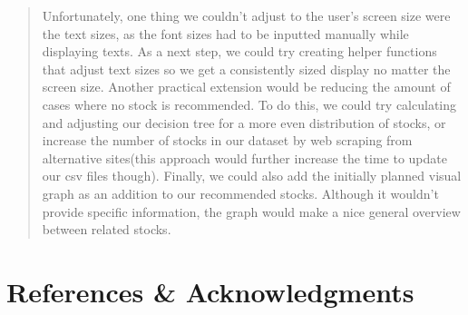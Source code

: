 \documentclass[fontsize=12pt]{article}
\begin{document}
\begin{quote}
Unfortunately, one thing we couldn’t adjust to the user’s screen size were the text sizes, as the font sizes had to be inputted manually while displaying texts. As a next step, we could try creating helper functions that adjust text sizes so we get a consistently sized display no matter the screen size. Another practical extension would be reducing the amount of cases where no stock is recommended. To do this, we could try calculating and adjusting our decision tree for a more even distribution of stocks, or increase the number of stocks in our dataset by web scraping from alternative sites(this approach would further increase the time to update our csv files though). Finally, we could also add the initially planned visual graph as an addition to our recommended stocks. Although it wouldn’t provide specific information, the graph would make a nice general overview between related stocks.
\end{quote}

\section*{References \& Acknowledgments}
\end{document}
